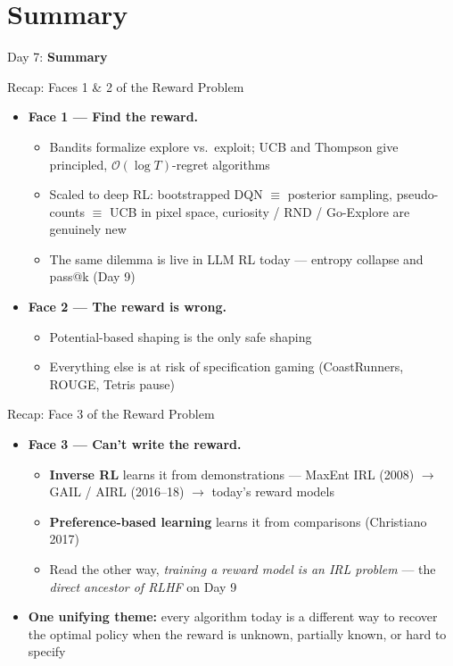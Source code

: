 \section{Summary}
\begin{frame}{}
    \LARGE Day 7: \textbf{Summary}
\end{frame}

\begin{frame}{Recap: Faces 1 \& 2 of the Reward Problem}
\begin{itemize}
    \setlength{\itemsep}{0.7em}
    \item \textbf{Face 1 --- Find the reward.}
    \begin{itemize}
        \item Bandits formalize explore vs.\ exploit; UCB and Thompson give principled, $\mathcal{O}(\log T)$-regret algorithms
        \item Scaled to deep RL: bootstrapped DQN $\equiv$ posterior sampling, pseudo-counts $\equiv$ UCB in pixel space, curiosity / RND / Go-Explore are genuinely new
        \item The same dilemma is live in LLM RL today --- entropy collapse and pass@k (Day 9)
    \end{itemize}
    \item \textbf{Face 2 --- The reward is wrong.}
    \begin{itemize}
        \item Potential-based shaping is the only safe shaping
        \item Everything else is at risk of specification gaming (CoastRunners, ROUGE, Tetris pause)
    \end{itemize}
\end{itemize}
\end{frame}

\begin{frame}{Recap: Face 3 of the Reward Problem}
\begin{itemize}
    \setlength{\itemsep}{0.7em}
    \item \textbf{Face 3 --- Can't write the reward.}
    \begin{itemize}
        \item \textbf{Inverse RL} learns it from demonstrations --- MaxEnt IRL (2008) $\to$ GAIL / AIRL (2016--18) $\to$ today's reward models
        \item \textbf{Preference-based learning} learns it from comparisons (Christiano 2017)
        \item Read the other way, \emph{training a reward model is an IRL problem} --- the \emph{direct ancestor of RLHF} on Day 9
    \end{itemize}
    \item \textbf{One unifying theme:} every algorithm today is a different way to recover the optimal policy when the reward is unknown, partially known, or hard to specify
\end{itemize}
\end{frame}

